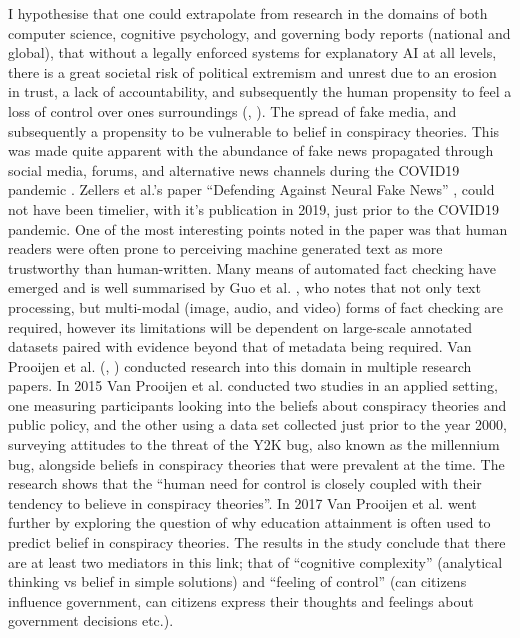 I hypothesise that one could extrapolate from research in the domains of both computer science, cognitive psychology, and governing body reports (national and global), that without a legally enforced systems for explanatory AI at all levels, there is a great societal risk of political extremism and unrest due to an erosion in trust, a lack of accountability, and subsequently the human propensity to feel a loss of control over ones surroundings (\cite{vanprooijenInfluenceControlBelief2015}, \cite{vanprooijenWhyEducationPredicts2017}). The spread of fake media, and subsequently a propensity to be vulnerable to belief in conspiracy theories. This was made quite apparent with the abundance of fake news propagated through social media, forums, and alternative news channels during the COVID19 pandemic \cite{apukeFakeNewsCOVID192021}. Zellers et al.'s paper “Defending Against Neural Fake News” \cite{NEURIPS2019_3e9f0fc9}, could not have been timelier, with it's publication in 2019, just prior to the COVID19 pandemic. One of the most interesting points noted in the paper was that human readers were often prone to perceiving machine generated text as more trustworthy than human-written. Many means of automated fact checking have emerged and is well summarised by Guo et al. \cite{guoSurveyAutomatedFactChecking2022}, who notes that not only text processing, but multi-modal (image, audio, and video) forms of fact checking are required, however its limitations will be dependent on large-scale annotated datasets paired with evidence beyond that of metadata being required. Van Prooijen et al. (\cite{vanprooijenInfluenceControlBelief2015}, \cite{vanprooijenWhyEducationPredicts2017}) conducted research into this domain in multiple research papers. In 2015 Van Prooijen et al. conducted two studies in an applied setting, one measuring participants looking into the beliefs about conspiracy theories and public policy, and the other using a data set collected just prior to the year 2000, surveying attitudes to the threat of the Y2K bug, also known as the millennium bug, alongside beliefs in conspiracy theories that were prevalent at the time. The research shows that the “human need for control is closely coupled with their tendency to believe in conspiracy theories”. In 2017 Van Prooijen et al. went further by exploring the question of why education attainment is often used to predict belief in conspiracy theories. The results in the study conclude that there are at least two mediators in this link; that of “cognitive complexity” (analytical thinking vs belief in simple solutions) and “feeling of control” (can citizens influence government, can citizens express their thoughts and feelings about government decisions etc.). 

